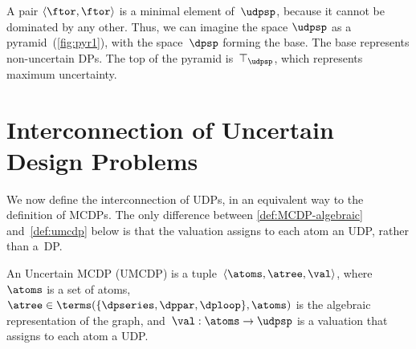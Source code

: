 A pair $\langle\ftor,\ftor\rangle$ is a minimal element of~$\udpsp$,
because it cannot be dominated by any other. Thus, we can imagine
the space $\udpsp$ as a pyramid~(\cref{fig:pyr1}), with the
space~$\dpsp$ forming the base. The base represents non-uncertain
DPs. The top of the pyramid is~$\top_{\udpsp}$, which represents
maximum uncertainty.


\section{Interconnection of Uncertain Design Problems\label{sec:UMCDP}}

We now define the interconnection of UDPs, in an equivalent way to
the definition of MCDPs. The only difference between \cref{def:MCDP-algebraic}
and~\cref{def:umcdp} below is that the valuation assigns to
each atom an UDP, rather than a~DP.
\begin{definition}
    \label{def:umcdp}An Uncertain MCDP (UMCDP) is a tuple~$\left\langle \atoms,\atree,\val\right\rangle $,
    where~$\atoms$ is a set of atoms,~$\atree\in\terms(\{\dpseries,\dppar,\dploop\},\atoms)$
    is the algebraic representation of the graph, and~$\val:\atoms\rightarrow\udpsp$
    is a valuation that assigns to each atom a UDP.
\end{definition}


